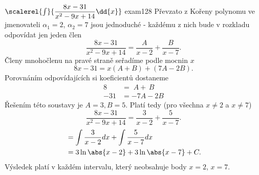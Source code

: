 \begin{mathexam}{\(\protect\scalerel{\int}{\dfrac{8x-31}{x^2-9x+14}\dd{x}}\) \hfill
  \cite[s.~90]{Knichal}}{exam128} 
  Převzato z \cite[s.~90]{Knichal} Kořeny polynomu ve jmenovateli $\alpha_1 = 2$, $\alpha_2 = 7$
  jsou jednoduché - každému z nich bude v rozkladu odpovídat jen jeden člen
  $$\frac{8x-31}{x^2-9x+14} = \frac{A}{x-2} + \frac{B}{x-7}.$$ Členy mnohočlenu na pravé straně
  seřadíme podle mocnin $x$ $$8x-31 = x(A+B)+(7A-2B).$$ Porovnáním odpovídajících si koeficientů
  dostaneme
  \begin{align*}
    8   &=   \; A + \, B \\
    -31 &= -7A - 2B
  \end{align*}
  Řešením této soustavy je $A = 3, B = 5$. Platí tedy (pro všechna $x \neq 2$ a $x \neq 7$)
  $$\frac{8x-31}{x^2-9x+14} = \frac{3}{x-2} + \frac{5}{x-7}.$$
  \begin{align*}
      &= \int{\frac{3}{x-2}}dx + \int{\frac{5}{x-7}}dx      \\
      &= 3\ln\abs{x-2} + 3\ln\abs{x-7} + C.
  \end{align*}
  Výsledek platí v každém intervalu, který neobsahuje body \(x = 2\), \(x = 7\).
\end{mathexam}